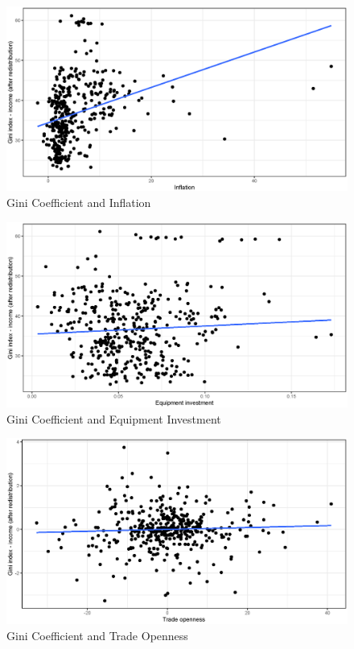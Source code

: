 \documentclass[a4paper,11pt]{article}
\begin{document}
\begin{figure}
    \caption{Gini Coefficient and Inflation}
    \label{fig:giniinfl}
\includegraphics[width=\textwidth, keepaspectratio]{figures/InflGiniNet}
\end{figure}

\begin{figure}
    \caption{Gini Coefficient and Equipment Investment}
    \label{fig:giniequipi}
\includegraphics[width=\textwidth, keepaspectratio]{figures/EquipIGiniNet}
\end{figure}

\begin{figure}
    \caption{Gini Coefficient and Trade Openness}
    \label{fig:ginitrade}
\includegraphics[width=\textwidth, keepaspectratio]{figures/TradeOpenGiniNet}
\end{figure}
\end{document}
